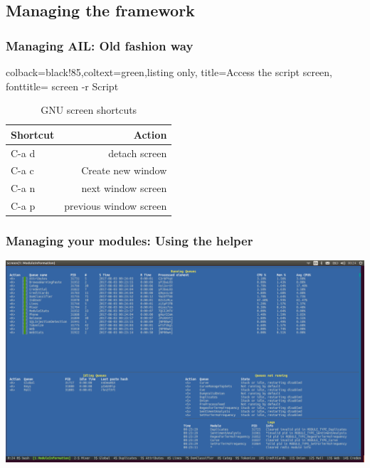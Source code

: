 \documentclass{beamer}
\begin{document}
\subsection{Managing the framework}
\begin{frame}[fragile]
    \frametitle{Managing AIL: Old fashion way}
    \lstset{style=bash}
    \begin{tcblisting}{colback=black!85,coltext=green,listing only,
        title=Access the script screen, fonttitle=\bfseries}
screen -r Script
\end{tcblisting}
\begin{table}
        \caption{GNU screen shortcuts}
    \begin{tabular}{lr}
        \toprule
        Shortcut & Action \\
        \midrule
        C-a d & detach screen \\
        \midrule
        C-a c & Create new window \\
        \midrule
        C-a n & next window screen \\
        \midrule
        C-a p & previous window screen \\
        \bottomrule
    \end{tabular}
\end{table}
\end{frame}


\begin{frame}[fragile]
    \frametitle{Managing your modules: Using the helper}
    \centerline{\includegraphics[scale=0.22]{images/moduleManager.png}}
\end{frame}
\end{document}
